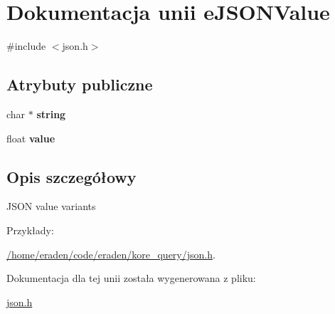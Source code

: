 \hypertarget{unioneJSONValue}{}\section{Dokumentacja unii e\+J\+S\+O\+N\+Value}
\label{unioneJSONValue}


{\ttfamily \#include $<$json.\+h$>$}

\subsection*{Atrybuty publiczne}
\begin{DoxyCompactItemize}
\item 
char $\ast$ {\bfseries string}\hypertarget{unioneJSONValue_a3af3c31add822d679ce6b66425f5f783}{}\label{unioneJSONValue_a3af3c31add822d679ce6b66425f5f783}

\item 
float {\bfseries value}\hypertarget{unioneJSONValue_ab11e9f87db2db5f129e49acefe49072c}{}\label{unioneJSONValue_ab11e9f87db2db5f129e49acefe49072c}

\end{DoxyCompactItemize}


\subsection{Opis szczegółowy}
J\+S\+ON value variants \begin{Desc}
\item[Przykłady\+: ]\par
\hyperlink{_2home_2eraden_2code_2eraden_2kore_query_2json_8h-example}{/home/eraden/code/eraden/kore\+\_\+query/json.\+h}.\end{Desc}


Dokumentacja dla tej unii została wygenerowana z pliku\+:\begin{DoxyCompactItemize}
\item 
\hyperlink{json_8h}{json.\+h}\end{DoxyCompactItemize}
